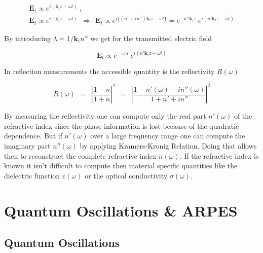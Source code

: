 \documentclass[10pt]{report}
\numberwithin{equation}{chapter}
\newcommand{\vc}[1]{ %
  \mathbf{#1}
}
\begin{document}
\begin{gather} 
  \vc{E}_i \propto e^{i(\vc{k}_i z - \omega t)} ~, \nonumber \\
  \vc{E}_t \propto e^{i(\vc{k}_t z - \omega t)} ~~\Rightarrow~~ \vc{E}_t \propto e^{i\{(n'+in'')\vc{k}_i z - \omega t\}} = e^{-n''\vc{k}_i z}\ e^{i(n' \vc{k}_i z - \omega t)} 
\end{gather}


By introducing $\lambda = 1/\vc{k}_i n''$ we get for the transmitted electric field

\begin{equation}
  \vc{E}_t \propto e^{-z/\lambda}\ e^{i(n'\vc{k}_i z - \omega t)}
\end{equation}

In reflection measurements the accessible quantity is the reflectivity $R(\omega)$

\begin{equation}
  R(\omega) ~~=~~ \left| \frac{1-n}{1+n} \right|^2 
  ~~=~~ \left| \frac{1-n'(\omega) - i n''(\omega)}{1 + n' + in''} \right|^2
\end{equation}

By measuring the reflectivity one can compute only the real part $n'(\omega)$ of the refractive index since the phase information is lost because of the quadratic dependence. But if $n'(\omega)$ over a large frequency range one can compute the imaginary part $n''(\omega)$ by applying Kramers-Kronig Relation. Doing that allows then to reconstruct the complete refractive index $n(\omega)$. If the refractive index is known it isn't difficult to compute then material specific quantities like the dielectric function $\varepsilon(\omega)$ or the optical conductivity $\sigma(\omega)$.

%

\chapter{Quantum Oscillations \& ARPES}



%
\section{Quantum Oscillations}
\end{document}
